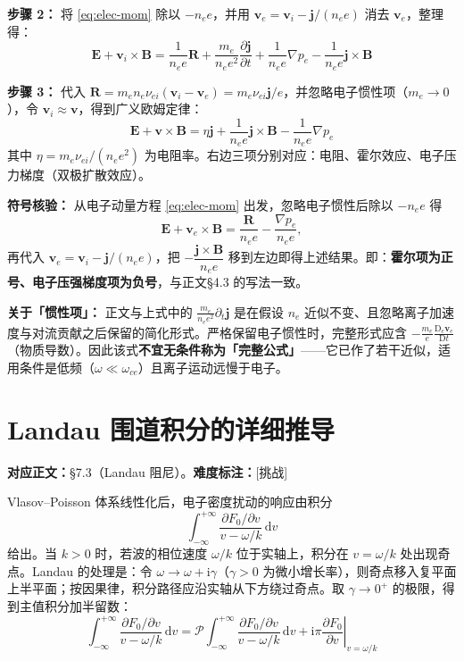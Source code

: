 \documentclass[12pt,a4paper,openany,oneside]{book}
\newcommand{\diff}{\mathrm{d}}
\newcommand{\ii}{\mathrm{i}}
\newcommand{\vect}[1]{\bm{#1}}
\newcommand{\grad}{\nabla}
\begin{document}
\textbf{步骤 2：} 将 \eqref{eq:elec-mom} 除以 $-n_e e$，并用 $\vect{v}_e = \vect{v}_i - \vect{j}/(n_e e)$ 消去 $\vect{v}_e$，整理得：
\begin{equation}
\vect{E} + \vect{v}_i\times\vect{B} = \frac{1}{n_e e}\vect{R} + \frac{m_e}{n_e e^2}\frac{\partial \vect{j}}{\partial t} + \frac{1}{n_e e}\grad p_e - \frac{1}{n_e e}\vect{j}\times\vect{B}
\label{eq:ch9-generalized-ohm}
\end{equation}

\textbf{步骤 3：} 代入 $\vect{R}=m_e n_e \nu_{ei}(\vect{v}_i-\vect{v}_e)=m_e \nu_{ei}\vect{j}/e$，并忽略电子惯性项（$m_e\to 0$），令 $\vect{v}_i\approx\vect{v}$，得到广义欧姆定律：
\begin{equation}
\boxed{
\vect{E} + \vect{v}\times\vect{B} = \eta\vect{j} + \frac{1}{n_e e}\vect{j}\times\vect{B} - \frac{1}{n_e e}\grad p_e
}
\label{eq:ch9-generalized-ohm-simplified}
\end{equation}
其中 $\eta=m_e\nu_{ei}/(n_e e^2)$ 为电阻率。右边三项分别对应：电阻、霍尔效应、电子压力梯度（双极扩散效应）。

\textbf{符号核验：} 从电子动量方程 \eqref{eq:elec-mom} 出发，忽略电子惯性后除以 $-n_ee$ 得
\[
\vect{E}+\vect{v}_e\times\vect{B} = \frac{\vect{R}}{n_ee} - \frac{\grad p_e}{n_ee},
\]
再代入 $\vect{v}_e=\vect{v}_i-\vect{j}/(n_ee)$，把 $-\dfrac{\vect{j}\times\vect{B}}{n_ee}$ 移到左边即得上述结果。即：\textbf{霍尔项为正号、电子压强梯度项为负号}，与正文\S 4.3 的写法一致。

\textbf{关于「惯性项」：} 正文与上式中的 $\frac{m_e}{n_ee^2}\partial_t\vect{j}$ 是在假设 $n_e$ 近似不变、且忽略离子加速度与对流贡献之后保留的简化形式。严格保留电子惯性时，完整形式应含 $-\frac{m_e}{e}\frac{\mathrm{D}_e\vect{v}_e}{\mathrm{D}t}$（物质导数）。因此该式\textbf{不宜无条件称为「完整公式」}——它已作了若干近似，适用条件是低频（$\omega\ll\omega_{ce}$）且离子运动远慢于电子。


\section{Landau 围道积分的详细推导}
\label{sec:landau-contour}

\textbf{对应正文：}\S 7.3（Landau 阻尼）。\textbf{难度标注：}[挑战]

Vlasov--Poisson 体系线性化后，电子密度扰动的响应由积分
\begin{equation}
\int_{-\infty}^{+\infty} \frac{\partial F_0/\partial v}{v-\omega/k}\,\diff v
\label{eq:ch7-landau-integral}
\end{equation}
给出。当 $k>0$ 时，若波的相位速度 $\omega/k$ 位于实轴上，积分在 $v=\omega/k$ 处出现奇点。Landau 的处理是：令 $\omega\to\omega+\ii\gamma$（$\gamma>0$ 为微小增长率），则奇点移入复平面上半平面；按因果律，积分路径应沿实轴从下方绕过奇点。取 $\gamma\to 0^+$ 的极限，得到主值积分加半留数：
\begin{equation}
\int_{-\infty}^{+\infty} \frac{\partial F_0/\partial v}{v-\omega/k}\,\diff v
= \mathcal{P}\int_{-\infty}^{+\infty} \frac{\partial F_0/\partial v}{v-\omega/k}\,\diff v
+ \ii\pi\left.\frac{\partial F_0}{\partial v}\right|_{v=\omega/k}
\label{eq:ch7-landau-contour}
\end{equation}
\end{document}
